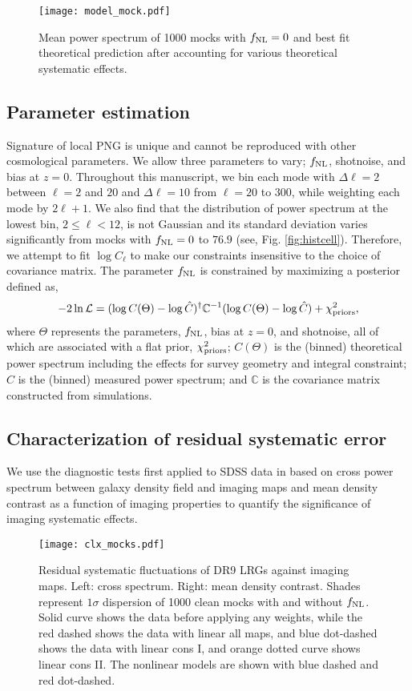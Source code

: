 \begin{figure}
\centering
\texttt{[image: model\_mock.pdf]}
\caption{Mean power spectrum of 1000 mocks with $f_{\rm NL}=0$ and best fit theoretical prediction after accounting for various theoretical systematic effects.}\label{fig:model_mock}
\end{figure}


\subsection{Parameter estimation}
Signature of local PNG is unique and cannot be reproduced with other cosmological parameters. We allow three parameters to vary; $f_{\rm NL}$, shotnoise, and bias at $z=0$. Throughout this manuscript, we bin each mode with $\Delta\ell=2$ between $\ell=2$ and $20$ and $\Delta \ell=10$ from $\ell=20$ to $300$, while weighting each mode by $2\ell+1$. We also find that the distribution of power spectrum at the lowest bin, $2\leq \ell < 12$,  is not Gaussian and its standard deviation varies significantly from mocks with $f_{\rm NL}=0$ to $76.9$ (see, Fig. \ref{fig:histcell}). Therefore, we attempt to fit $\log C_{\ell}$ to make our constraints insensitive to the choice of covariance matrix. The parameter $f_{\rm NL}$ is constrained by maximizing a posterior defined as,
\begin{equation}
-2\ln\mathcal{L} = (\log C(\Theta)-\log \hat{C})^{\dagger} \mathbb{C}^{-1} (\log C(\Theta)-\log \hat{C}) + \chi^{2}_{\rm priors},
\end{equation}
where $\Theta$ represents the parameters, $f_{\rm NL}$, bias at $z=0$, and shotnoise, all of which are associated with a flat prior, $\chi^{2}_{\rm priors}$; $C(\Theta)$ is the (binned) theoretical power spectrum including the effects for survey geometry and integral constraint; $\hat{C}$ is the (binned) measured power spectrum; and $\mathbb{C}$ is the covariance matrix constructed from simulations. 

\subsection{Characterization of residual systematic error}
\label{ssec:characterization}
We use the diagnostic tests first applied to SDSS data in \cite{rezaie2021primordial} based on cross power spectrum between galaxy density field and imaging maps and mean density contrast as a function of imaging properties to quantify the significance of imaging systematic effects. 
\begin{figure*}
\centering
\texttt{[image: clx\_mocks.pdf]}
\caption{Residual systematic fluctuations of DR9 LRGs against imaging maps. Left: cross spectrum. Right: mean density contrast. Shades represent $1\sigma$ dispersion of 1000 clean mocks with and without $f_{\rm NL}$. Solid curve shows the data before applying any weights, while the red dashed shows the data with linear all maps, and blue dot-dashed shows the data with linear cons I, and orange dotted curve shows linear cons II. The nonlinear models are shown with blue dashed and red dot-dashed.}\label{fig:clxmock}
\end{figure*}

